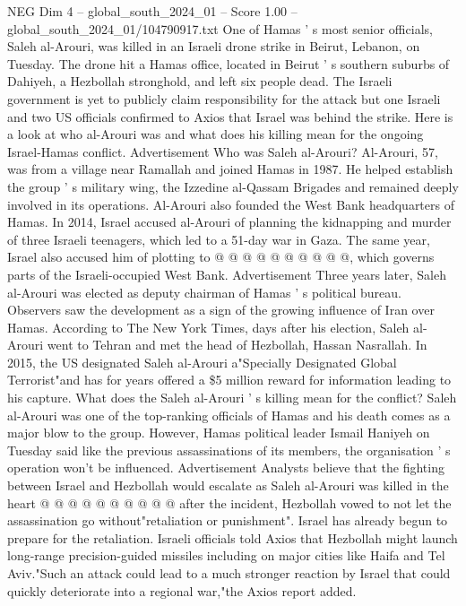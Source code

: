 \begin{textsample}{NEG Dim 4 – global\_south\_2024\_01 – Score 1.00 – global\_south\_2024\_01/104790917.txt}  \label{ex:f4_neg_085}
One of Hamas ' s most senior officials, Saleh al-Arouri, was killed in an Israeli drone strike in Beirut, Lebanon, on Tuesday.
The drone hit a Hamas office, located in Beirut ' s southern suburbs of Dahiyeh, a Hezbollah stronghold, and left six people dead.
The Israeli government is yet to publicly claim responsibility for the attack but one Israeli and two US officials confirmed to Axios that Israel was behind the strike.
Here is a look at who al-Arouri was and what does his killing mean for the ongoing Israel-Hamas conflict.
Advertisement Who was Saleh al-Arouri?
Al-Arouri, 57, was from a village near Ramallah and joined Hamas in 1987.
He helped establish the group ' s military wing, the Izzedine al-Qassam Brigades and remained deeply involved in its operations.
Al-Arouri also founded the West Bank headquarters of Hamas.
In 2014, Israel accused al-Arouri of planning the kidnapping and murder of three Israeli teenagers, which led to a 51-day war in Gaza.
The same year, Israel also accused him of plotting to @ @ @ @ @ @ @ @ @ @, which governs parts of the Israeli-occupied West Bank.
Advertisement Three years later, Saleh al-Arouri was elected as deputy chairman of Hamas ' s political bureau.
Observers saw the development as a sign of the growing influence of Iran over Hamas.
According to The New York Times, days after his election, Saleh al-Arouri went to Tehran and met the head of Hezbollah, Hassan Nasrallah.
In 2015, the US designated Saleh al-Arouri a"Specially Designated Global Terrorist"and has for years offered a \$5 million reward for information leading to his capture.
What does the Saleh al-Arouri ' s killing mean for the conflict?
Saleh al-Arouri was one of the top-ranking officials of Hamas and his death comes as a major blow to the group.
However, Hamas political leader Ismail Haniyeh on Tuesday said like the previous assassinations of its members, the organisation ' s operation won't be influenced.
Advertisement Analysts believe that the fighting between Israel and Hezbollah would escalate as Saleh al-Arouri was killed in the heart @ @ @ @ @ @ @ @ @ @ after the incident, Hezbollah vowed to not let the assassination go without"retaliation or punishment".
Israel has already begun to prepare for the retaliation.
Israeli officials told Axios that Hezbollah might launch long-range precision-guided missiles including on major cities like Haifa and Tel Aviv."Such an attack could lead to a much stronger reaction by Israel that could quickly deteriorate into a regional war,"the Axios report added.

\end{textsample}

